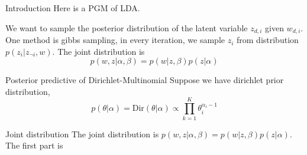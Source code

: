 \begin{frame}{Introduction}
    Here is a PGM of LDA.
    
    We want to sample the posterior distribution of the latent variable $z_{d,i}$ given $w_{d,i}$. One method is gibbs sampling, in every iteration, we sample $z_i$ from distribution $p(z_i | z_{\neg i}, w)$.
    The joint distribution is 
    $$p(w,z | \alpha, \beta) = p(w | z, \beta) p(z | \alpha)$$
    \end{frame}
    \begin{frame}{Posterior predictive of Dirichlet-Multinomial}
    Suppose we have dirichlet prior distribution,
    $$p(\theta | \alpha) = \text{Dir}(\theta | \alpha) \propto \prod_{k=1}^K \theta_i^{\alpha_i - 1}$$
    
    \end{frame}
    \begin{frame}[allowframebreaks]{Joint distribution}
    The joint distribution is $p(w,z | \alpha, \beta) = p(w | z, \beta) p(z | \alpha)$. The first part is
    

\end{frame}
